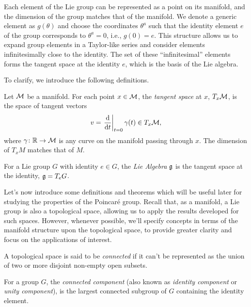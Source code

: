 Each element of the Lie group can be represented as a point on its manifold, and the dimension of the group matches that of the manifold. We denote a generic element as $g(\theta)$ and choose the coordinates $\theta^a$ such that the identity element $e$ of the group corresponds to $\theta^a = 0$, i.e., $g(0) = e$. This structure allows us to expand group elements in a Taylor-like series and consider elements infinitesimally close to the identity. The set of these “infinitesimal” elements forms the tangent space at the identity $e$, which is the basis of the Lie algebra. 

To clarify, we introduce the following definitions.

\begin{definition}
    Let $\mathcal{M}$ be a manifold. For each point $x \in \mathcal{M}$, the \emph{tangent space} at $x$, $T_x \mathcal{M}$, is the space of tangent vectors
    \begin{equation}
        v = \left. \frac{\mathop{}\!\mathrm{d}}{\mathop{}\!\mathrm{d} t}\right|_{t=0} \gamma(t)  \in T_x \mathcal{M},
    \end{equation}
    where $\gamma\colon \mathbb{R} \to \mathcal{M}$ is any curve on the manifold passing through $x$. The dimension of $T_xM$ matches that of $M$.
\end{definition}

\begin{definition}
    For a Lie group $G$ with identity $e \in G$, the \emph{Lie Algebra} $\mathfrak{g}$ is the tangent space at the identity, $\mathfrak{g} = T_e G$.
\end{definition}


Let's now introduce some definitions and theorems which will be useful later for studying the properties of the Poincaré group. Recall that, as a manifold, a Lie group is also a topological space, allowing us to apply the results developed for such spaces. However, whenever possible, we'll specify concepts in terms of the manifold structure upon the topological space, to provide greater clarity and focus on the applications of interest.

\begin{definition}\label{def:connected}
    A topological space is said to be \emph{connected} if it can't be represented as the union of two or more disjoint non-empty open subsets.
\end{definition}

\begin{definition}\label{def:connected-component}
    For a group $G$, the \emph{connected component} (also known as \emph{identity component} or \emph{unity component}), is the largest connected subgroup of $G$ containing the identity element.
\end{definition}

